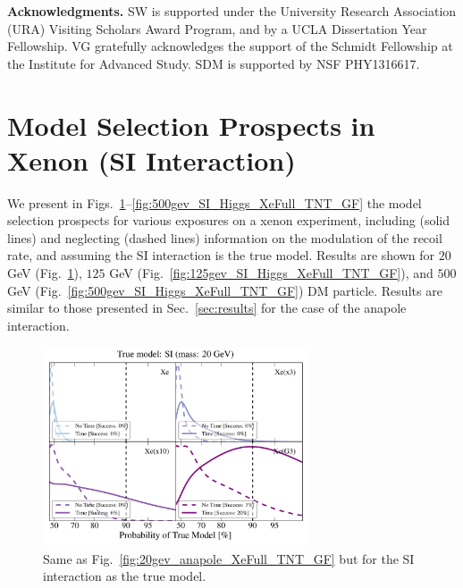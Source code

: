 \documentclass[11pt]{article}
\newcommand{\Sec}[1]{Sec.~\ref{#1}} \newcommand{\Secs}[2]{Secs.~\ref{#1} and \ref{#2}} \newcommand{\Secm}[2]{Secs.~\ref{#1} through \ref{#2}}
\newcommand{\Fig}[1]{Fig.~\ref{#1}} \newcommand{\Figs}[2]{Figs.~\ref{#1} and \ref{#2}}
\begin{document}
\textbf{Acknowledgments.} SW is supported under the University Research Association (URA) Visiting Scholars Award Program, and by a UCLA Dissertation Year Fellowship. VG gratefully acknowledges the support of the Schmidt Fellowship at the Institute for Advanced Study. SDM is supported by NSF PHY1316617. %

\appendix

\section{Model Selection Prospects in Xenon (SI Interaction)}
We present in Figs.~\ref{fig:20gev_SI_Higgs_XeFull_TNT_GF}--\ref{fig:500gev_SI_Higgs_XeFull_TNT_GF} the model selection prospects for various exposures on a xenon experiment, including (solid lines) and neglecting (dashed lines) information on the modulation of the recoil rate, and assuming the SI interaction is the true model. Results are shown for $20$ GeV (\Fig{fig:20gev_SI_Higgs_XeFull_TNT_GF}), $125$ GeV (\Fig{fig:125gev_SI_Higgs_XeFull_TNT_GF}), and $500$ GeV (\Fig{fig:500gev_SI_Higgs_XeFull_TNT_GF}) DM particle. Results are similar to those presented in \Sec{sec:results} for the case of the anapole interaction. 


\begin{figure}
\centering
\includegraphics[width=0.7\textwidth]{plots/PDF_20GeV_SI_Higgs_50sims_Xe_Xe3x_Xe10x_XeG3_GF_TNT.pdf}
\caption{\label{fig:20gev_SI_Higgs_XeFull_TNT_GF}
Same as Fig.~\ref{fig:20gev_anapole_XeFull_TNT_GF} but for the SI interaction as the true model.}
\end{figure}
\end{document}
